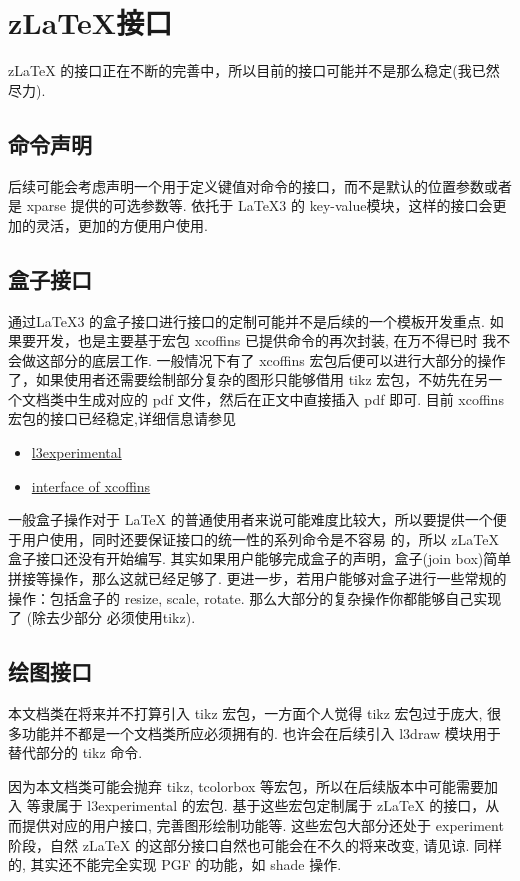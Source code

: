 \clearpage
\section{z\LaTeX{}接口}
z\LaTeX{} 的接口正在不断的完善中，所以目前的接口可能并不是那么稳定(我已然尽力). 

\subsection{命令声明}
后续可能会考虑声明一个用于定义键值对命令的接口，而不是默认的位置参数或者是 xparse 提供的可选参数等.
依托于 \LaTeX3 的 {key-value}模块，这样的接口会更加的灵活，更加的方便用户使用.


\subsection{盒子接口}
通过\LaTeX3 的盒子接口进行接口的定制可能并不是后续的一个模板开发重点. 如果要开发，也是主要基于宏包 {xcoffins} 已提供命令的再次封装, 在万不得已时
我不会做这部分的底层工作. 一般情况下有了 {xcoffins} 宏包后便可以进行大部分的操作了，如果使用者还需要绘制部分复杂的图形只能够借用 {tikz}
宏包，不妨先在另一个文档类中生成对应的 pdf 文件，然后在正文中直接插入 pdf 即可. 目前 xcoffins 宏包的接口已经稳定,详细信息请参见
\begin{itemize}
    \item \href{https://ctan.org/pkg/l3experimental}{l3experimental}
    \item \href{https://tex.stackexchange.com/a/397835/294585}{interface of xcoffins}
\end{itemize}

一般盒子操作对于 \LaTeX{} 的普通使用者来说可能难度比较大，所以要提供一个便于用户使用，同时还要保证接口的统一性的系列命令是不容易
的，所以 z\LaTeX{} 盒子接口还没有开始编写. 其实如果用户能够完成盒子的声明，盒子(join box)简单拼接等操作，那么这就已经足够了.
更进一步，若用户能够对盒子进行一些常规的操作：包括盒子的 resize, scale, rotate. 那么大部分的复杂操作你都能够自己实现了 (除去少部分
必须使用tikz).


\subsection{绘图接口}
本文档类在将来并不打算引入 {tikz} 宏包，一方面个人觉得 tikz 宏包过于庞大, 很多功能并不都是一个文档类所应必须拥有的.
也许会在后续引入 {l3draw} 模块用于替代部分的 tikz 命令. 

因为本文档类可能会抛弃 {tikz, tcolorbox} 等宏包，所以在后续版本中可能需要加入 
等隶属于 l3experimental 的宏包. 基于这些宏包定制属于 z\LaTeX{} 的接口，从而提供对应的用户接口, 完善图形绘制功能等.
这些宏包大部分还处于 experiment 阶段，自然 z\LaTeX{} 的这部分接口自然也可能会在不久的将来改变, 请见谅. 同样的,
 其实还不能完全实现 PGF 的功能，如 shade 操作.

